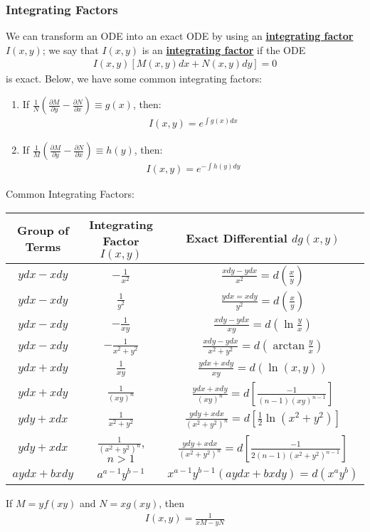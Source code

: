 \documentclass[11pt]{article}
\newcommand{\dfn}[1]{\underline{\textbf{#1}}}
\begin{document}
\subsubsection{Integrating Factors}
We can transform an ODE into an exact ODE by using an \dfn{integrating factor} $I(x,y)$; we say that $I(x,y)$ is an \dfn{integrating factor} if the ODE
\begin{align*}
	I(x,y) [ M(x,y) dx + N(x,y) dy ] = 0 
\end{align*}
is exact. Below, we have some common integrating factors:
\begin{enumerate}
	\item If $ \frac{1}{N} \left( \frac{\partial M}{\partial y} - \frac{\partial N}{\partial x} \right) \equiv g(x)$, then:
	\begin{align*}
		I(x,y) = e^{\int g(x) dx } 
	\end{align*}
	\item If $\frac{1}{M} \left( \frac{\partial M}{\partial y} - \frac{\partial N}{\partial x} \right) \equiv h(y)$, then: 
	\begin{align*}
		I(x,y) = e^{-\int h(y) dy } 
	\end{align*}
\end{enumerate}
Common Integrating Factors:
\begin{table}[H]
\centering
\begin{tabular}{|c|c|c|}
\hline 
Group of Terms & Integrating Factor $I(x,y)$ & Exact Differential $dg(x,y)$  \\
\hline 
  $ydx - xdy$ &  $- \frac{1}{x^2}$ &   $\frac{xdy - ydx}{x^2} = d \left ( \frac{x}{y} \right)$ \\
\hline 
 $ydx - xdy$  &  $\frac{1}{y^2}$    &  $\frac{ydx = xdy}{y^2}  = d \left( \frac{x}{y} \right)$    \\
 \hline 
 $ydx - xdy$  & $- \frac{1}{xy}$ & 	$\frac{xdy - ydx}{xy} = d \left(\ln  \frac{y}{x} \right) $	\\
 \hline 
 $ydx - xdy$  & $ - \frac{1}{x^2 + y^2}$	& 	$\frac{xdy - y dx}{x^2 + y^2} = d \left(  \arctan{ \frac{y}{x}}\right) $	\\     
 \hline            
 $ydx + xdy $  & 	$\frac{1}{xy}$	& $\frac{ydx + xdy}{xy} = d(\ln(x,y))$ \\
 \hline 
 $ydx + xdy $  &  $ \frac{1}{(xy)^n}$	& $\frac{ydx + xdy}{(xy)^n} = d \left[  \frac{-1}{(n-1)(xy)^{n-1}} \right] $\\      
 \hline 
 $ydy + xdx $ & $ \frac{1}{x^2+y^2}$ & $\frac{ydy + xdx}{(x^2 + y^2)^n} = d \left[ \frac{1}{2} \ln ( x^2 + y^2) \right] $ \\
 \hline 
 $ydy + xdx$ & $\frac{1}{(x^2+y^2)^n}$, $n > 1$& $\frac{ydy + xdx}{(x^2 + y^2)^n} = d \left[ \frac{-1}{2(n-1)(x^2+y^2)^{n-1}} \right] $ \\
 \hline 
$ay dx + bx dy $ & $a^{a-1}y^{b-1}$ & $x^{a-1}y^{b-1}(ay dx + bx dy ) = d(x^a y^b)$ \\ 
\hline 
\end{tabular}
\end{table}
If $M= yf(xy)$ and $N=xg(xy)$, then
\begin{align}
I(x,y) = \frac{1}{xM - yN}	
\end{align}
\end{document}
